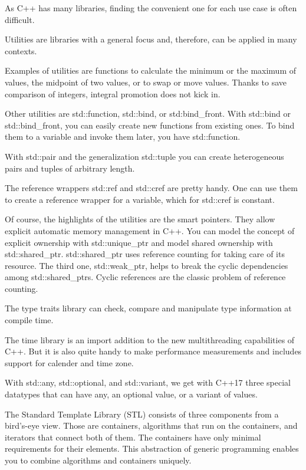 As C++ has many libraries, finding the convenient one for each use case is often difficult.


Utilities are libraries with a general focus and, therefore, can be applied in many contexts.

Examples of utilities are functions to calculate the minimum or the maximum of values, the midpoint of two values, or to swap or move values. Thanks to save comparison of integers, integral promotion does not kick in.

Other utilities are std::function, std::bind, or std:bind\_front. With std::bind or std::bind\_front, you can easily create new functions from existing ones. To bind them to a variable and invoke them later, you have std::function.

With std::pair and the generalization std::tuple you can create heterogeneous pairs and tuples of arbitrary length.

The reference wrappers std::ref and std::cref are pretty handy. One can use them to create a reference wrapper for a variable, which for std::cref is constant.

Of course, the highlights of the utilities are the smart pointers. They allow explicit automatic memory management in C++. You can model the concept of explicit ownership with std::unique\_ptr and model shared ownership with std::shared\_ptr. std::shared\_ptr uses reference counting for taking care of its resource. The third one, std::weak\_ptr, helps to break the cyclic dependencies among std::shared\_ptrs. Cyclic references are the classic problem of reference counting.

The type traits library can check, compare and manipulate type information at compile time.

The time library is an import addition to the new multithreading capabilities of C++. But it is also quite handy to make performance measurements and includes support for calender and time zone.

With std::any, std::optional, and std::variant, we get with C++17 three special datatypes that can have any, an optional value, or a variant of values.



The Standard Template Library (STL) consists of three components from a bird’s-eye view. Those are containers, algorithms that run on the containers, and iterators that connect both of them.
The containers have only minimal requirements for their elements. This abstraction of generic programming enables you to combine algorithms and containers uniquely.

